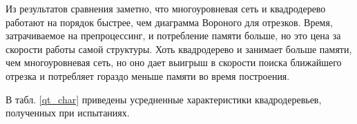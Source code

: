 \begin{table}[ht]
\centering
\renewcommand{\arraystretch}{1.1}
\end{table}

\FloatBarrier
Из результатов сравнения заметно, что многоуровневая сеть и
квадродерево работают на порядок быстрее, чем диаграмма Вороного для отрезков. Время, затрачиваемое на
препроцессинг, и потребление памяти больше, но это цена за скорости работы самой структуры.
Хоть квадродерево и занимает больше памяти, чем многоуровневая сеть, но
оно дает выигрыш в скорости поиска ближайшего отрезка и потребляет гораздо 
меньше памяти во время построения.

В табл. \ref{qt_char} приведены усредненные характеристики квадродеревьев,
полученных при испытаниях.


\begin{table}[ht]
\centering
\renewcommand{\arraystretch}{1.1}
\end{table}

\FloatBarrier

